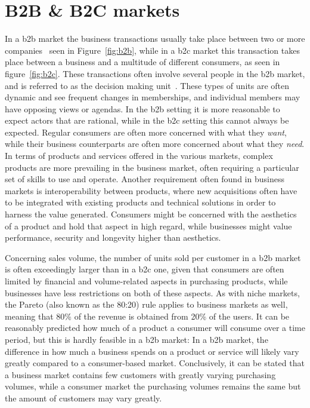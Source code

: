 \section{B2B \& B2C markets}
In a \gls{b2b} market the business transactions usually take place between two or more companies~\cite{jewels2001towards} seen in Figure~\ref{fig:b2b}, while in a \gls{b2c} market this transaction takes place between a business and a multitude of different consumers, as seen in figure~\ref{fig:b2c}. These transactions often involve several people in the \gls{b2b} market, and is referred to as the decision making unit~\cite{paulhaguenickhaguematthewharrison}. These types of units are often dynamic and see frequent changes in memberships, and individual members may have opposing views or agendas. In the \gls{b2b} setting it is more reasonable to expect actors that are rational, while in the \gls{b2c} setting this cannot always be expected. Regular consumers are often more concerned with what they \textit{want}, while their business counterparts are often more concerned about what they \textit{need}. In terms of products and services offered in the various markets, complex products are more prevailing in the business market, often requiring a particular set of skills to use and operate. Another requirement often found in business markets is interoperability between products, where new acquisitions often have to be integrated with existing products and technical solutions in order to harness the value generated. Consumers might be concerned with the aesthetics of a product and hold that aspect in high regard, while businesses might value performance, security and longevity higher than aesthetics. 


Concerning sales volume, the number of units sold per customer in a \gls{b2b} market is often exceedingly larger than in a \gls{b2c} one, given that consumers are often limited by financial and volume-related aspects in purchasing products, while businesses have less restrictions on both of these aspects. As with niche markets, the Pareto (also known as the 80:20) rule applies to business markets as well, meaning that 80\% of the revenue is obtained from 20\% of the users. It can be reasonably predicted how much of a product a consumer will consume over a time period, but this is hardly feasible in a \gls{b2b} market: In a \gls{b2b} market, the difference in how much a business spends on a product or service will likely vary greatly compared to a consumer-based market. Conclusively, it can be stated that a business market contains few customers with greatly varying purchasing volumes, while a consumer market the purchasing volumes remains the same but the amount of customers may vary greatly.

